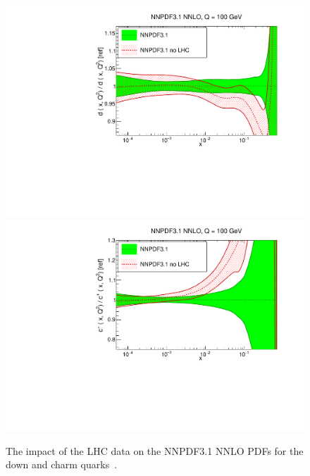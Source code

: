 %
\begin{figure}[t]
\begin{center}
  \includegraphics[scale=0.35]{Strong-Interaction/xd-31-nnlo-LHC.pdf}
  \includegraphics[scale=0.35]{Strong-Interaction/xc-31-nnlo-LHC.pdf}
  \caption{\small
The impact of the LHC data on the NNPDF3.1 NNLO PDFs  for the down and charm quarks~\cite{Ball:2017nwa}.
\label{fig.impact}}
\end{center}
\end{figure}

